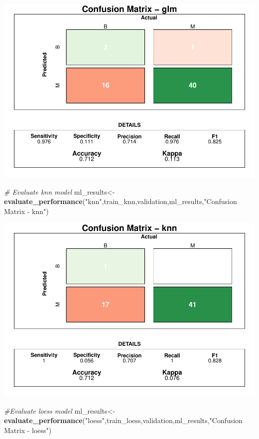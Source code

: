 \documentclass[]{article}
\newenvironment{Shaded}{\begin{snugshade}}{\end{snugshade}}
\newcommand{\CommentTok}[1]{\textcolor[rgb]{0.56,0.35,0.01}{\textit{#1}}}
\newcommand{\KeywordTok}[1]{\textcolor[rgb]{0.13,0.29,0.53}{\textbf{#1}}}
\newcommand{\NormalTok}[1]{#1}
\newcommand{\StringTok}[1]{\textcolor[rgb]{0.31,0.60,0.02}{#1}}
\begin{document}
\includegraphics{LiverDisease_files/figure-latex/unnamed-chunk-39-1.pdf}

\begin{Shaded}
\begin{Highlighting}[]
\CommentTok{# Evaluate knn model}
\NormalTok{ml_results<-}\KeywordTok{evaluate_performance}\NormalTok{(}\StringTok{"knn"}\NormalTok{,train_knn,validation,ml_results,}\StringTok{"Confusion Matrix - knn"}\NormalTok{)}
\end{Highlighting}
\end{Shaded}

\includegraphics{LiverDisease_files/figure-latex/unnamed-chunk-40-1.pdf}

\begin{Shaded}
\begin{Highlighting}[]
\CommentTok{#Evaluate loess model}
\NormalTok{ml_results<-}\KeywordTok{evaluate_performance}\NormalTok{(}\StringTok{"loess"}\NormalTok{,train_loess,validation,ml_results,}\StringTok{"Confusion Matrix - loess"}\NormalTok{)}
\end{Highlighting}
\end{Shaded}
\end{document}
